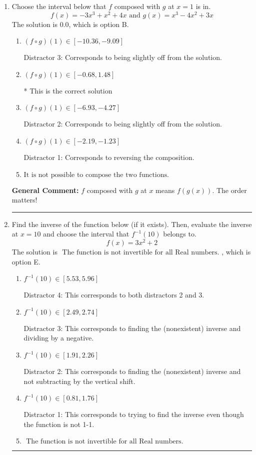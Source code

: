 \documentclass{extbook}[14pt]
\newcommand{\litem}[1]{\item #1

\rule{\textwidth}{0.4pt}}
\begin{document}
\begin{enumerate}\litem{
Choose the interval below that $f$ composed with $g$ at $x=1$ is in.
\[ f(x) = -3x^{3} + x^{2} +4 x \text{ and } g(x) = x^{3} -4 x^{2} +3 x \]The solution is \( 0.0 \), which is option B.\begin{enumerate}[label=\Alph*.]
\item \( (f \circ g)(1) \in [-10.36, -9.09] \)

 Distractor 3: Corresponds to being slightly off from the solution.
\item \( (f \circ g)(1) \in [-0.68, 1.48] \)

* This is the correct solution
\item \( (f \circ g)(1) \in [-6.93, -4.27] \)

 Distractor 2: Corresponds to being slightly off from the solution.
\item \( (f \circ g)(1) \in [-2.19, -1.23] \)

 Distractor 1: Corresponds to reversing the composition.
\item \( \text{It is not possible to compose the two functions.} \)


\end{enumerate}

\textbf{General Comment:} $f$ composed with $g$ at $x$ means $f(g(x))$. The order matters!
}
\litem{
Find the inverse of the function below (if it exists). Then, evaluate the inverse at $x = 10$ and choose the interval that $f^{-1}(10)$ belongs to.
\[ f(x) = 3 x^2 + 2 \]The solution is \( \text{ The function is not invertible for all Real numbers. } \), which is option E.\begin{enumerate}[label=\Alph*.]
\item \( f^{-1}(10) \in [5.53, 5.96] \)

 Distractor 4: This corresponds to both distractors 2 and 3.
\item \( f^{-1}(10) \in [2.49, 2.74] \)

 Distractor 3: This corresponds to finding the (nonexistent) inverse and dividing by a negative.
\item \( f^{-1}(10) \in [1.91, 2.26] \)

 Distractor 2: This corresponds to finding the (nonexistent) inverse and not subtracting by the vertical shift.
\item \( f^{-1}(10) \in [0.81, 1.76] \)

 Distractor 1: This corresponds to trying to find the inverse even though the function is not 1-1. 
\item \( \text{ The function is not invertible for all Real numbers. } \)


\end{enumerate}}
\end{enumerate}
\end{document}

